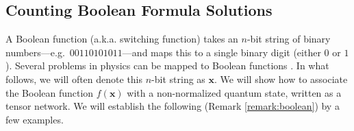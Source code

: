 \documentclass[aps,pra,12pt,nofootinbib,superscriptaddress,longbibliography]{revtex4-1}
\newcommand{\jb}[1]{\todo[inline]{{\textbf{[}JB: #1\textbf{]}}}}
\newcommand{\vb}[1]{}
\theoremstyle{plain}
\newtheorem{theorem}{Theorem}
\theoremstyle{definition}
\newtheorem{example}[theorem]{Example}
\newcommand{\ket}[1]{\mbox{$|#1\rangle$}}
\newcommand{\braket}[2]{\mbox{$\langle #1|#2\rangle$}}
\newcommand{\x}{\mathbf{x}}
\begin{document}
% 
% 
% 
% 
% 


 
\subsection[Boolean Tensor Counters]{Counting Boolean Formula Solutions}\label{sec:counter} 
  
A Boolean function (a.k.a. switching function) takes an $n$-bit string of binary numbers---e.g.~$00110101011$---and maps this to a single binary digit (either $0$ or $1$). Several problems in physics can be mapped to Boolean functions \cite{2012EL.....9957004W}. 	
In what follows, we will often denote this $n$-bit string as $\x$.
We will show how to associate the Boolean function $f(\x)$ with a non-normalized quantum state, written as a tensor network. We will establish the following (Remark \ref{remark:boolean}) by a few examples.  
\end{document}
